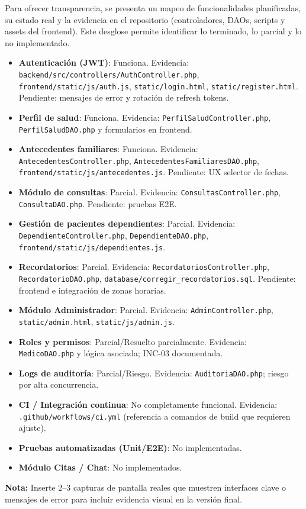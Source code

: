 \documentclass[a4paper,11pt]{article}
\begin{document}
Para ofrecer transparencia, se presenta un mapeo de funcionalidades planificadas, su estado real y la evidencia en el repositorio (controladores, DAOs, scripts y assets del frontend). Este desglose permite identificar lo terminado, lo parcial y lo no implementado.

\begin{itemize}
	\item \textbf{Autenticación (JWT)}: Funciona. Evidencia: \texttt{backend/src/controllers/AuthController.php}, \texttt{frontend/static/js/auth.js}, \texttt{static/login.html}, \texttt{static/register.html}. Pendiente: mensajes de error y rotación de refresh tokens.
	\item \textbf{Perfil de salud}: Funciona. Evidencia: \texttt{PerfilSaludController.php}, \texttt{PerfilSaludDAO.php} y formularios en frontend.
	\item \textbf{Antecedentes familiares}: Funciona. Evidencia: \texttt{AntecedentesController.php}, \texttt{AntecedentesFamiliaresDAO.php}, \texttt{frontend/static/js/antecedentes.js}. Pendiente: UX selector de fechas.
	\item \textbf{Módulo de consultas}: Parcial. Evidencia: \texttt{ConsultasController.php}, \texttt{ConsultaDAO.php}. Pendiente: pruebas E2E.
	\item \textbf{Gestión de pacientes dependientes}: Parcial. Evidencia: \texttt{DependienteController.php}, \texttt{DependienteDAO.php}, \texttt{frontend/static/js/dependientes.js}.
	\item \textbf{Recordatorios}: Parcial. Evidencia: \texttt{RecordatoriosController.php}, \texttt{RecordatorioDAO.php}, \texttt{database/corregir_recordatorios.sql}. Pendiente: frontend e integración de zonas horarias.
	\item \textbf{Módulo Administrador}: Parcial. Evidencia: \texttt{AdminController.php}, \texttt{static/admin.html}, \texttt{static/js/admin.js}.
	\item \textbf{Roles y permisos}: Parcial/Resuelto parcialmente. Evidencia: \texttt{MedicoDAO.php} y lógica asociada; INC-03 documentada.
	\item \textbf{Logs de auditoría}: Parcial/Riesgo. Evidencia: \texttt{AuditoriaDAO.php}; riesgo por alta concurrencia.
	\item \textbf{CI / Integración continua}: No completamente funcional. Evidencia: \texttt{.github/workflows/ci.yml} (referencia a comandos de build que requieren ajuste).
	\item \textbf{Pruebas automatizadas (Unit/E2E)}: No implementadas.
	\item \textbf{Módulo Citas / Chat}: No implementados.
\end{itemize}

\bigskip
\noindent\textbf{Nota:} Inserte 2--3 capturas de pantalla reales que muestren interfaces clave o mensajes de error para incluir evidencia visual en la versión final.
\end{document}
